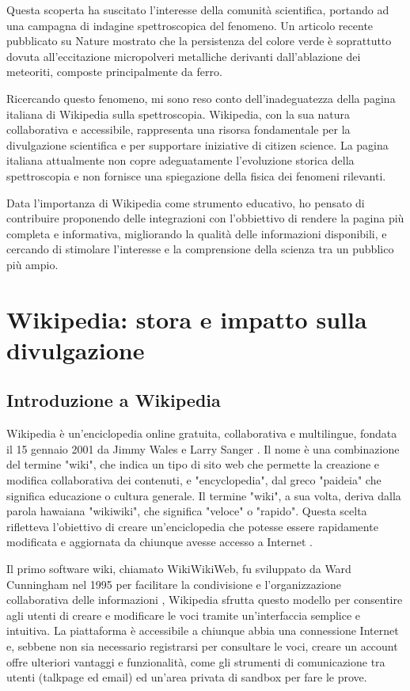\documentclass[12pt,a4paper]{report}
\begin{document}
Questa scoperta ha suscitato l'interesse della comunità scientifica, portando ad una campagna di indagine spettroscopica del fenomeno. Un articolo recente pubblicato su Nature mostrato che la persistenza del colore verde è soprattutto dovuta all'eccitazione micropolveri metalliche derivanti dall'ablazione dei meteoriti, composte principalmente da ferro\cite{passas-varo2023spectroscopy}.

Ricercando questo fenomeno, mi sono reso conto dell'inadeguatezza della pagina italiana di Wikipedia sulla spettroscopia. Wikipedia, con la sua natura collaborativa e accessibile, rappresenta una risorsa fondamentale per la divulgazione scientifica e per supportare iniziative di citizen science. La pagina italiana attualmente non copre adeguatamente l'evoluzione storica della spettroscopia e non fornisce una spiegazione della fisica dei fenomeni rilevanti. 

Data l'importanza di Wikipedia come strumento educativo, ho pensato di contribuire proponendo delle integrazioni con l'obbiettivo di rendere la pagina più completa e informativa, migliorando la qualità delle informazioni disponibili, e cercando di stimolare l'interesse e la comprensione della scienza tra un pubblico più ampio.

\chapter{Wikipedia: stora e impatto sulla divulgazione}

\section{Introduzione a Wikipedia}

Wikipedia è un'enciclopedia online gratuita, collaborativa e multilingue, fondata il 15 gennaio 2001 da Jimmy Wales e Larry Sanger \cite{lih2009wikipedia}. Il nome è una combinazione del termine "wiki", che indica un tipo di sito web che permette la creazione e modifica collaborativa dei contenuti, e "encyclopedia", dal greco "paideia" che significa educazione o cultura generale. Il termine "wiki", a sua volta, deriva dalla parola hawaiana "wikiwiki", che significa "veloce" o "rapido". Questa scelta rifletteva l'obiettivo di creare un'enciclopedia che potesse essere rapidamente modificata e aggiornata da chiunque avesse accesso a Internet \cite{cunningham2001wiki}. 

Il primo software wiki, chiamato WikiWikiWeb, fu sviluppato da Ward Cunningham nel 1995 per facilitare la condivisione e l'organizzazione collaborativa delle informazioni \cite{cunningham2001wiki}, Wikipedia sfrutta questo modello per consentire agli utenti di creare e modificare le voci tramite un'interfaccia semplice e intuitiva. La piattaforma è accessibile a chiunque abbia una connessione Internet e, sebbene non sia necessario registrarsi per consultare le voci, creare un account offre ulteriori vantaggi e funzionalità, come gli strumenti di comunicazione tra utenti (talkpage ed email) ed un'area privata di sandbox per fare le prove.
\end{document}
